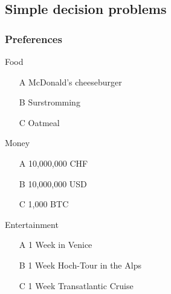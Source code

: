 \subsection{Simple decision problems}
\begin{frame}
  \frametitle{Preferences}
  \begin{example}
    \begin{block}{Food}
      \begin{itemize}
      \item[A] McDonald's cheeseburger
      \item[B] Surstromming
      \item[C] Oatmeal
      \end{itemize}
    \end{block}
    \begin{block}{Money}
      \begin{itemize}
      \item[A] 10,000,000 CHF
      \item[B] 10,000,000 USD
      \item[C] 1,000 BTC
      \end{itemize}
    \end{block}
    \begin{block}{Entertainment}
      \begin{itemize}
      \item[A] 1 Week in Venice
      \item[B] 1 Week Hoch-Tour in the Alps
      \item[C] 1 Week Transatlantic Cruise
      \end{itemize}
    \end{block}
  \end{example}
\end{frame}

